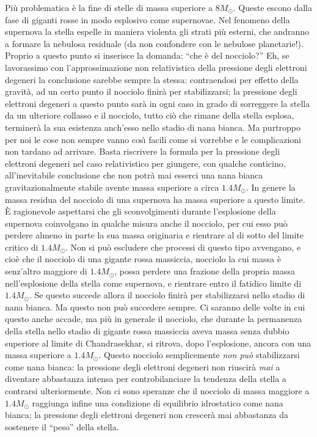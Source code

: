 Più problematica è la fine di stelle di massa superiore a $8M_{\odot}$. Queste escono dalla fase di giganti rosse in modo esplosivo come supernovae. Nel fenomeno della supernova la stella espelle in maniera violenta gli strati più esterni, che andranno a formare la nebulosa residuale (da non confondere con le nebulose planetarie!). Proprio a questo punto si inserisce la domanda: ``che è del nocciolo?'' Eh, se lavorassimo con l'approssimazione non relativistica della pressione degli elettroni degeneri la conclusione sarebbe sempre la stessa: contraendosi per effetto della gravit\`{a}, ad un certo punto il nocciolo finir\`{a} per stabilizzarsi; la pressione degli elettroni degeneri a questo punto sar\`{a} in ogni caso in grado di sorreggere la stella da un ulteriore collasso e il nocciolo, tutto ciò che rimane della stella esplosa, terminer\`{a} la sua esistenza anch'esso nello stadio di nana bianca. Ma purtroppo per noi le cose non sempre vanno cos\`{\i}{} facili come si vorrebbe e le complicazioni non tardano ad arrivare. Basta riscrivere la formula per la pressione degli elettroni degeneri nel caso relativistico per giungere, con qualche conticino, all'inevitabile conclusione che non potr\`{a} mai esserci una nana bianca gravitazionalmente stabile avente massa superiore a circa $1.4 M_{\odot}$. In genere la massa residua del nocciolo di una supernova ha massa superiore a questo limite. \`E ragionevole aspettarsi che gli sconvolgimenti durante l'esplosione della supernova coinvolgano in qualche misura anche il nocciolo, per cui esso può perdere almeno in parte la sua massa originaria e rientrare al di sotto del limite critico di $1.4 M_{\odot}$. Non si può escludere che processi di questo tipo avvengano, e cioè che il nocciolo di una gigante rossa massiccia, nocciolo la cui massa è senz'altro maggiore di $1.4 M_{\odot}$, possa perdere una frazione della propria massa nell'esplosione della stella come supernova, e rientrare entro il fatidico limite di $1.4 M_{\odot}$. Se questo succede allora il nocciolo finir\`{a} per stabilizzarsi nello stadio di nana bianca.
Ma questo non può succedere sempre. Ci saranno delle volte in cui questo anche accade, ma più in generale il nocciolo, che durante la permanenza della stella nello stadio di gigante rossa massiccia aveva massa senza dubbio superiore al limite di Chandrasekhar, si ritrova, dopo l'esplosione, ancora con una massa superiore a $1.4 M_{\odot}$. Questo nocciolo semplicemente \emph{non può} stabilizzarsi come nana bianca: la pressione degli elettroni degeneri non riuscir\`{a} \emph{mai} a diventare abbastanza intensa per controbilanciare la tendenza della stella a contrarsi ulteriormente. Non ci sono speranze che il nocciolo di massa maggiore a $1.4 M_{\odot}$ raggiunga infine una condizione di equilibrio idrostatico come nana bianca; la pressione degli elettroni degeneri non crescer\`{a} mai abbastanza da sostenere il ``peso'' della stella.
